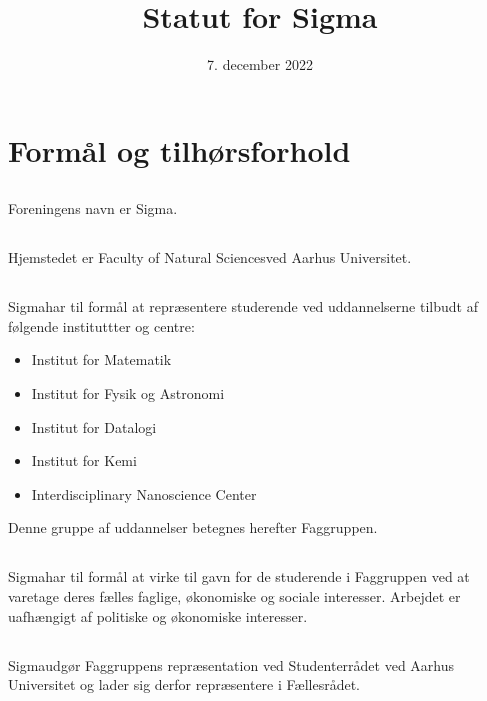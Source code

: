 \documentclass[danish,a4paper,twocolumn]{article}
\newcommand{\foreningen}{Sigma}
\newcommand{\fakultetet}{Faculty of Natural Sciences}
\begin{document}
\title{\vspace{-2ex}Statut for \foreningen\vspace{-5ex}}
\date{7. december 2022}
\maketitle

\section{Formål og tilhørsforhold}
\subsection{}Foreningens navn er \foreningen.
\subsection{}Hjemstedet er \fakultetet ved Aarhus Universitet.

\subsection{}\foreningen har til formål at repræsentere studerende ved uddannelserne tilbudt af følgende instituttter og centre:
\begin{itemize}
        \item Institut for Matematik
        \item Institut for Fysik og Astronomi
        \item Institut for Datalogi
        \item Institut for Kemi
        \item Interdisciplinary Nanoscience Center
\end{itemize}
Denne gruppe af uddannelser betegnes herefter Faggruppen.
\subsection{}\foreningen har til formål at virke til gavn for de studerende i Faggruppen ved at varetage deres fælles faglige, økonomiske og sociale interesser. Arbejdet er uafhængigt af politiske og økonomiske interesser.
\subsection{}\foreningen udgør Faggruppens repræsentation ved Studenterrådet ved Aarhus Universitet og lader sig derfor repræsentere i Fællesrådet.
\end{document}

